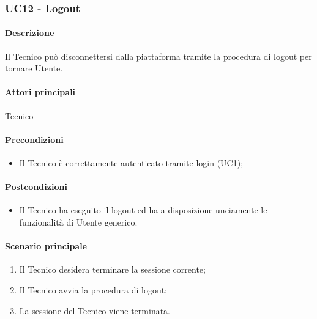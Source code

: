 \subsubsection{UC12 - Logout}\label{UC12}
\paragraph*{Descrizione}
Il Tecnico può disconnettersi dalla piattaforma tramite la procedura di logout per tornare Utente.

\paragraph*{Attori principali}
Tecnico

\paragraph*{Precondizioni}
\begin{itemize}
  \item Il Tecnico è correttamente autenticato tramite login (\hyperref[UC1]{UC1});
\end{itemize}

\paragraph*{Postcondizioni}
\begin{itemize}
  \item Il Tecnico ha eseguito il logout ed ha a disposizione unciamente le funzionalità di Utente generico.
\end{itemize}

\paragraph*{Scenario principale}
\begin{enumerate}
  \item Il Tecnico desidera terminare la sessione corrente;
  \item Il Tecnico avvia la procedura di logout;
  \item La sessione del Tecnico viene terminata.  
\end{enumerate}

